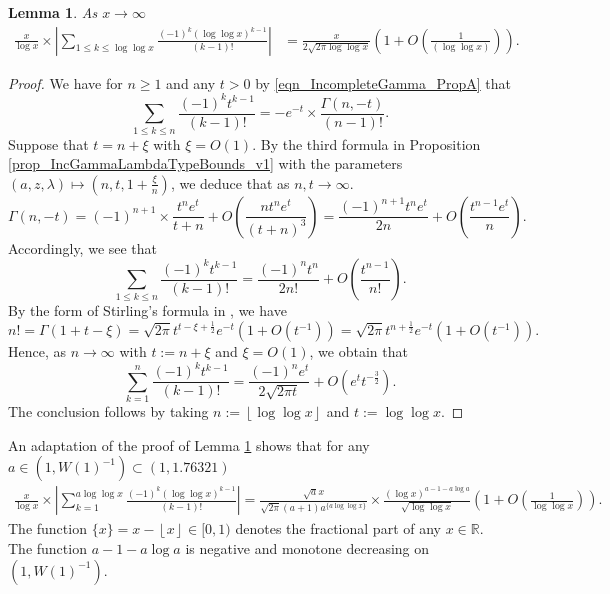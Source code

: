 \documentclass[11pt,reqno,a4letter]{article}
\newcommand{\hlocalref}[1]{\hyperref[#1]{\ref{#1}}}
\numberwithin{equation}{section}
\numberwithin{figure}{section}
\numberwithin{table}{section}
\newcommand{\cf}{\textit{cf.\ }}
\newcommand{\floor}[1]{\left\lfloor #1 \right\rfloor}
\theoremstyle{plain}
\newtheorem{lemma}[theorem]{Lemma}
\numberwithin{theorem}{section}
\theoremstyle{definition}
\begin{document}
\begin{lemma}
\label{lemma_ConvenientIncGammaFuncTypePartialSumAsymptotics_v2}
As $x \rightarrow \infty$  
\begin{align*}
\frac{x}{\log x} \times \left\lvert \sum_{1 \leq k \leq \log\log x} 
     \frac{(-1)^k (\log\log x)^{k-1}}{(k-1)!} \right\rvert 
     & = \frac{x}{2\sqrt{2\pi \log\log x}} 
     \left(1 + O\left(\frac{1}{(\log\log x)}\right)\right). 
\end{align*}
\end{lemma}
\begin{proof}
We have for $n \geq 1$ and any $t > 0$ by 
\eqref{eqn_IncompleteGamma_PropA} that 
\[
\sum_{1 \leq k \leq n} \frac{(-1)^k t^{k-1}}{(k-1)!} = -e^{-t} \times 
     \frac{\Gamma(n, -t)}{(n-1)!}. 
\]
Suppose that $t = n + \xi$ with $\xi = O(1)$. 
By the third formula 
in Proposition \hlocalref{prop_IncGammaLambdaTypeBounds_v1} 
with the parameters $(a, z, \lambda) \mapsto \left(n, t, 1 + \frac{\xi}{n}\right)$, 
we deduce that as $n,t \rightarrow \infty$. 
\begin{equation*}
\Gamma(n, -t) = (-1)^{n+1} \times \frac{t^n e^{t}}{t+n} + 
     O\left(\frac{n t^n e^{t}}{(t+n)^3}\right) = 
     \frac{(-1)^{n+1} t^n e^t}{2n} + O\left(\frac{t^{n-1} e^t}{n}\right). 
\end{equation*}
Accordingly, we see that 
\[
\sum_{1 \leq k \leq n} \frac{(-1)^k t^{k-1}}{(k-1)!} = 
      \frac{(-1)^{n} t^n}{2n!} + O\left(\frac{t^{n-1}}{n!}\right). 
\]
By the form of Stirling's formula in \cite[\cf Eq.\ (5.11.8)]{NISTHB}, we have 
\[
n! = \Gamma(1 + t - \xi) = \sqrt{2\pi} t^{t-\xi+\frac{1}{2}} e^{-t} \left(1 + O\left(t^{-1}\right)\right) = 
     \sqrt{2\pi} t^{n+\frac{1}{2}} e^{-t} \left(1 + O\left(t^{-1}\right)\right). 
\]
Hence, as $n \rightarrow \infty$ with $t := n + \xi$ and $\xi = O(1)$, we obtain that 
\[
\sum_{k=1}^{n} \frac{(-1)^k t^{k-1}}{(k-1)!} = \frac{(-1)^n e^t}{2 \sqrt{2\pi t}} + 
     O\left(e^t t^{-\frac{3}{2}}\right). 
\]
The conclusion follows by taking $n := \floor{\log\log x}$ and $t := \log\log x$. 
\end{proof}

An adaptation of the proof of 
Lemma \hlocalref{lemma_ConvenientIncGammaFuncTypePartialSumAsymptotics_v2} 
shows that for any $a \in \left(1, W(1)^{-1}\right) \subset (1, 1.76321)$ 
\begin{align*}
\frac{x}{\log x} \times \left\lvert \sum_{k=1}^{a \log\log x} 
     \frac{(-1)^{k} (\log\log x)^{k-1}}{(k-1)!} 
     \right\rvert = 
     \frac{\sqrt{a} x}{\sqrt{2\pi}(a+1) a^{\{a\log\log x\}}} 
     \times \frac{(\log x)^{a-1-a\log a}}{\sqrt{\log\log x}} 
     \left(1 + O\left(\frac{1}{\log\log x}\right)\right). 
\end{align*}
The function $\{x\} = x - \floor{x} \in [0, 1)$ denotes the fractional part of 
any $x \in \mathbb{R}$.
The function $a-1-a\log a$ is negative and monotone decreasing on 
$\left(1, W(1)^{-1}\right)$. 
\end{document}
